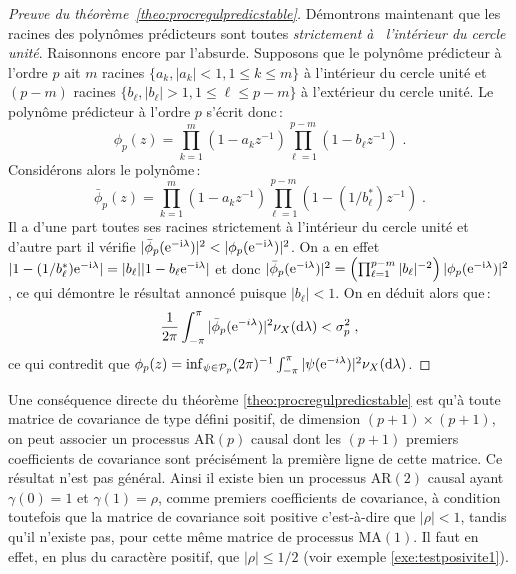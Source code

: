 \begin{proof}[Preuve du th\'eor\`eme~\ref{theo:procregulpredicstable}]
D\'emontrons maintenant que les racines des polyn\^omes
pr\'edicteurs sont toutes \emph{strictement \`a  l'int\'erieur du
cercle unit\'e}. Raisonnons encore par l'absurde. Supposons que le
polyn\^ome pr\'edicteur \`a l'ordre $p$ ait $m$ racines $\{a_k,
|a_k| < 1, 1 \le k \leq m \}$ \`a l'int\'erieur du cercle unit\'e et
$(p-m)$ racines $\{ b_{\ell}, |b_{\ell}| > 1, 1 \leq \ell \leq p-m
\}$ \`a l'ext\'erieur du cercle unit\'e. Le polyn\^ome pr\'edicteur
\`a l'ordre $p$ s'\'ecrit donc\,:
\[
 \phi_p(z)=
 \prod_{k=1}^m ( 1 - a_k z^{-1}) \prod_{\ell=1}^{p-m} (1 - b_{\ell} z^{-1})\;.
\]
Consid\'erons alors le polyn\^ome\,:
\[
 \bar{\phi}_p(z) =
 \prod_{k=1}^m (1 - a_k z^{-1}) \prod_{\ell=1}^{p-m} (1 - (1/b_{\ell}^{*}) z^{-1})\;.
\]
Il a d'une part toutes ses racines strictement \`a l'int\'erieur
du cercle unit\'e et d'autre part il v\'erifie
$|\bar{\phi}_p(\mathrm{e}^{-\mathrm{i}\lambda })|^2< |\phi_p(\mathrm{e}^{-\mathrm{i}\lambda })|^2$. On a
en effet $| 1 - (1/b_\ell^*) \mathrm{e}^{-\mathrm{i}\lambda } | = |b_\ell| |1 - b_\ell \mathrm{e}^{-\mathrm{i} \lambda }|$ et donc
$|\bar{\phi}_p(\mathrm{e}^{-\mathrm{i} \lambda })|^2 = \left (\prod_{\ell=1}^{p-m} |b_\ell|^{-2} \right )|\phi_p(\mathrm{e}^{-\mathrm{i}\lambda })|^2$, ce qui d\'emontre le r\'esultat
annonc\'e puisque $|b_\ell|<1$. On en d\'eduit alors
que\,:
\begin{gather*}
\frac{1}{2 \pi} \int_{-\pi}^{\pi} | \bar{\phi}_p(\mathrm{e}^{-i\lambda
})|^2 \nu_X(\mathrm{d}\lambda )   < \sigma_p^2\;,
\end{gather*}
ce qui contredit que $\phi_p(z)=\inf_{\psi \in \mathcal{P}_p}(2\pi)^{-1}
\int_{-\pi}^\pi |\psi(\mathrm{e}^{-i\lambda })|^2 \nu_X(\mathrm{d}\lambda )$.

\end{proof}
Une cons\'equence directe du th\'eor\`eme
\ref{theo:procregulpredicstable} est qu'\`a toute matrice de
covariance de type d\'efini positif, de dimension $(p+1)\times
(p+1)$, on peut associer un processus AR$(p)$ causal dont les
$(p+1)$ premiers coefficients de covariance sont pr\'ecis\'ement la
premi\`ere ligne de cette matrice. Ce r\'esultat n'est pas g\'en\'eral.
Ainsi il existe bien un processus AR$(2)$ causal ayant
$\gamma(0)=1$ et $\gamma(1)=\rho$, comme premiers coefficients de
covariance, \`a condition toutefois que la matrice de covariance
soit positive c'est-\`a-dire que $|\rho|<1$, tandis qu'il n'existe
pas, pour cette m\^{e}me matrice de processus MA$(1)$. Il faut en
effet, en plus du caract\`ere positif, que $|\rho|\leq 1/2$
(voir exemple \ref{exe:testposivite1}).
